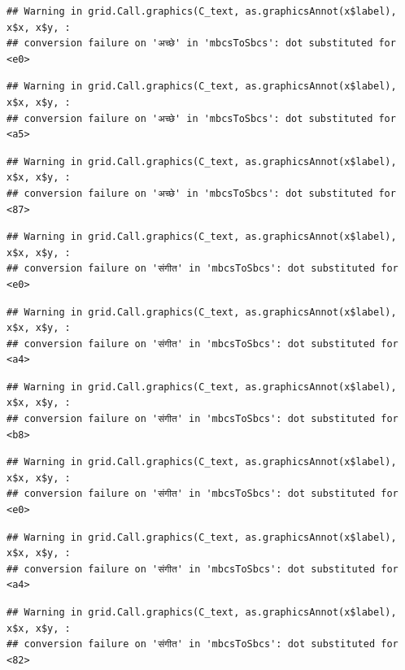 \documentclass[
]{article}
\begin{document}
\begin{verbatim}
## Warning in grid.Call.graphics(C_text, as.graphicsAnnot(x$label), x$x, x$y, :
## conversion failure on 'अच्छे' in 'mbcsToSbcs': dot substituted for <e0>
\end{verbatim}

\begin{verbatim}
## Warning in grid.Call.graphics(C_text, as.graphicsAnnot(x$label), x$x, x$y, :
## conversion failure on 'अच्छे' in 'mbcsToSbcs': dot substituted for <a5>
\end{verbatim}

\begin{verbatim}
## Warning in grid.Call.graphics(C_text, as.graphicsAnnot(x$label), x$x, x$y, :
## conversion failure on 'अच्छे' in 'mbcsToSbcs': dot substituted for <87>
\end{verbatim}

\begin{verbatim}
## Warning in grid.Call.graphics(C_text, as.graphicsAnnot(x$label), x$x, x$y, :
## conversion failure on 'संगीत' in 'mbcsToSbcs': dot substituted for <e0>
\end{verbatim}

\begin{verbatim}
## Warning in grid.Call.graphics(C_text, as.graphicsAnnot(x$label), x$x, x$y, :
## conversion failure on 'संगीत' in 'mbcsToSbcs': dot substituted for <a4>
\end{verbatim}

\begin{verbatim}
## Warning in grid.Call.graphics(C_text, as.graphicsAnnot(x$label), x$x, x$y, :
## conversion failure on 'संगीत' in 'mbcsToSbcs': dot substituted for <b8>
\end{verbatim}

\begin{verbatim}
## Warning in grid.Call.graphics(C_text, as.graphicsAnnot(x$label), x$x, x$y, :
## conversion failure on 'संगीत' in 'mbcsToSbcs': dot substituted for <e0>
\end{verbatim}

\begin{verbatim}
## Warning in grid.Call.graphics(C_text, as.graphicsAnnot(x$label), x$x, x$y, :
## conversion failure on 'संगीत' in 'mbcsToSbcs': dot substituted for <a4>
\end{verbatim}

\begin{verbatim}
## Warning in grid.Call.graphics(C_text, as.graphicsAnnot(x$label), x$x, x$y, :
## conversion failure on 'संगीत' in 'mbcsToSbcs': dot substituted for <82>
\end{verbatim}
\end{document}
